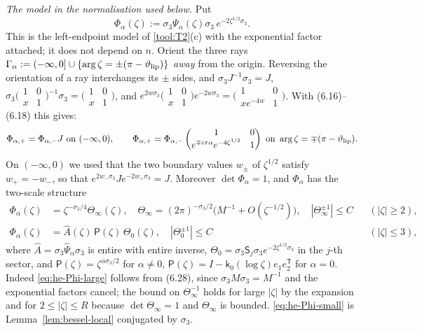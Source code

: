 \emph{The model in the normalisation used below.} Put
\begin{equation}\label{eq:he-Phi}
  \Phi_\alpha(\zeta):=\sigma_3\Psi_\alpha(\zeta)\sigma_3\,e^{-2\zeta^{1/2}\sigma_3}.
\end{equation}
This is the left-endpoint model of \ref{tool:T2}(c) with the exponential factor attached; it does not depend on $n$.
Orient the three rays $\Gamma_\alpha:=(-\infty,0]\cup\{\arg\zeta=\pm(\pi-\vartheta_{\mathrm{lip}})\}$ \emph{away} from the origin.
Reversing the orientation of a ray interchanges its $\pm$ sides, and $\sigma_3J^{-1}\sigma_3=J$,
$\sigma_3\bigl(\begin{smallmatrix}1&0\\x&1\end{smallmatrix}\bigr)^{-1}\sigma_3=\bigl(\begin{smallmatrix}1&0\\x&1\end{smallmatrix}\bigr)$,
and $e^{2w\sigma_3}\bigl(\begin{smallmatrix}1&0\\x&1\end{smallmatrix}\bigr)e^{-2w\sigma_3}
=\bigl(\begin{smallmatrix}1&0\\xe^{-4w}&1\end{smallmatrix}\bigr)$. With (6.16)--(6.18) this gives:
\begin{equation}\label{eq:he-Phi-jumps}
  \Phi_{\alpha,+}=\Phi_{\alpha,-}J\ \text{on }(-\infty,0),\qquad
  \Phi_{\alpha,+}=\Phi_{\alpha,-}\begin{pmatrix}1&0\\e^{\mp i\pi\alpha}e^{-4\zeta^{1/2}}&1\end{pmatrix}\ \text{on }
  \arg\zeta=\mp(\pi-\vartheta_{\mathrm{lip}}).
\end{equation}
On $(-\infty,0)$ we used that the two boundary values $w_\pm$ of $\zeta^{1/2}$ satisfy $w_+=-w_-$, so that
$e^{2w_-\sigma_3}Je^{-2w_+\sigma_3}=J$. Moreover $\det\Phi_\alpha=1$, and $\Phi_\alpha$ has the two-scale structure
\begin{align}
  \Phi_\alpha(\zeta)&=\zeta^{-\sigma_3/4}\Theta_\infty(\zeta),\quad
  \Theta_\infty=(2\pi)^{-\sigma_3/2}\bigl(M^{-1}+O(\zeta^{-1/2})\bigr),\quad |\Theta_\infty^{\pm1}|\le C
  &&(|\zeta|\ge2),\label{eq:he-Phi-large}\\
  \Phi_\alpha(\zeta)&=\hat A(\zeta)\,\mathsf P(\zeta)\,\Theta_0(\zeta),\quad |\Theta_0^{\pm1}|\le C
  &&(|\zeta|\le3),\label{eq:he-Phi-small}
\end{align}
where $\hat A=\sigma_3\hat\Psi_\alpha\sigma_3$ is entire with entire inverse, $\Theta_0=\sigma_3\mathsf S_j\sigma_3
e^{-2\zeta^{1/2}\sigma_3}$ in the $j$-th sector, and $\mathsf P(\zeta)=\zeta^{\alpha\sigma_3/2}$ for $\alpha\ne0$,
$\mathsf P(\zeta)=I-\mathsf k_0(\log\zeta)e_1e_2^{\mathsf T}$ for $\alpha=0$. Indeed \eqref{eq:he-Phi-large} follows from
(6.28), since $\sigma_3M\sigma_3=M^{-1}$ and the exponential factors cancel; the bound on $\Theta_\infty^{-1}$ holds for
large $|\zeta|$ by the expansion and for $2\le|\zeta|\le R$ because $\det\Theta_\infty=1$ and $\Theta_\infty$ is
bounded. \eqref{eq:he-Phi-small} is Lemma~\ref{lem:bessel-local} conjugated by $\sigma_3$.

